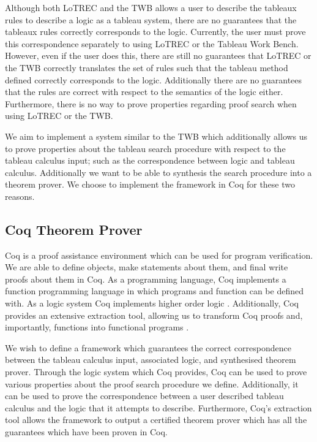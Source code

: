 \documentclass{llncs}
\begin{document}
Although both LoTREC and the TWB allows a user to describe the
tableaux rules to describe a logic as a tableau system, there are no guarantees
that the tableaux rules correctly corresponds to the logic. Currently, the user
must prove this correspondence separately to using LoTREC or the Tableau Work
Bench. However, even if the user does this, there are still no guarantees that
LoTREC or the TWB correctly translates the set of rules such
that the tableau method defined correctly corresponds to the logic.
Additionally there are no guarantees that the rules are correct with respect to
the semantics of  the logic either. Furthermore, there is no way to prove
properties regarding proof search when using LoTREC or the TWB.

We aim to implement a system similar to the TWB which
additionally allows us to prove properties about the tableau search procedure
with respect to the tableau calculus input; such as the correspondence between
logic and tableau calculus. Additionally we want to be able to synthesis the
search procedure into a theorem prover. We choose to implement the framework in
Coq for these two reasons.

\subsection{Coq Theorem Prover}

Coq is a proof assistance environment which can be used for program
verification. We are able to define objects, make statements about them, and
final write proofs about them in Coq. As a programming language, Coq implements
a function programming language in which programs and function can be defined
with. As a logic system Coq implements higher order logic \cite{huet1997coq}.
Additionally, Coq provides an extensive extraction tool, allowing us to
transform Coq proofs and, importantly, functions into functional programs
\cite{letouzey2008extraction}.

We wish to define a framework which guarantees the correct correspondence
between the tableau calculus input, associated logic, and synthesised theorem
prover. Through the logic system which Coq provides, Coq can be used to prove
various properties about the proof search procedure we define. Additionally,
it can be used to prove the correspondence between a user described tableau
calculus and the logic that it attempts to describe. Furthermore, Coq's
extraction tool allows the framework to output a certified theorem prover which
has all the guarantees which have been proven in Coq.
\end{document}
